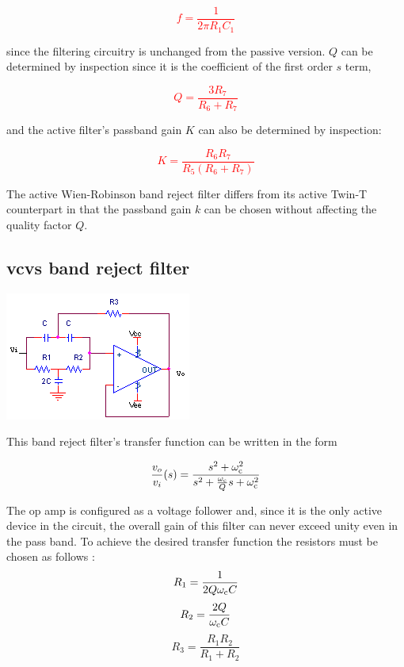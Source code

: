 \textcolor{red}{
\begin{equation}
f = \frac{1}{2\pi R_1 C_1}
\end{equation}
}

since the filtering circuitry is unchanged from the passive version.
$Q$ can be determined by inspection since it is the coefficient of the first order $s$ term,

\textcolor{red}{
\begin{equation}
Q = \frac{3R_7}{R_6 + R_7}
\end{equation}
}

and the active filter's passband gain $K$ can also be determined by inspection:

\textcolor{red}{
\begin{equation}
K = \frac{R_6 R_7}{R_5(R_6 + R_7)}
\end{equation}
}

The active Wien-Robinson band reject filter differs from its active Twin-T counterpart in that the passband gain $k$ can be chosen without affecting the quality factor $Q$.

\subsection{\ac{vcvs} band reject filter}
\begin{center}
	\includegraphics{schematics/vcvs_bandreject.PNG}
\end{center}
This band reject filter's transfer function can be written in the form

\textcolor{red}{
\begin{equation}
\frac{\vout}{\vin}(s) = \frac{s^2 + \wcutoff^2}{s^2 + \frac{\wcutoff}{Q}s + \wcutoff^2}
\label{eq:vcvs_bandreject}
\end{equation}
}

The op amp is configured as a voltage follower and, since it is the only active device in the circuit, the overall gain of this filter can never exceed unity even in the pass band.
To achieve the desired transfer function the resistors must be chosen as follows \autocite[145-146]{op-amp-circuits-johnson}:
\begin{equation}
R_1 = \frac{1}{2Q\omega_\mathrm{c} C}
\end{equation}
\begin{equation}
R_2 = \frac{2Q}{\omega_\mathrm{c} C}
\end{equation}
\begin{equation}
R_3 = \frac{R_1 R_2}{R_1 + R_2}
\end{equation}

